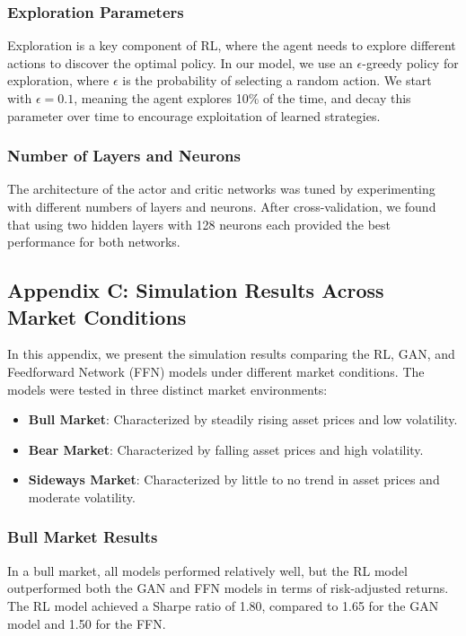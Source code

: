 \subsubsection*{Exploration Parameters}

Exploration is a key component of RL, where the agent needs to explore different actions to discover the optimal policy. In our model, we use an $\epsilon$-greedy policy for exploration, where $\epsilon$ is the probability of selecting a random action. We start with $\epsilon = 0.1$, meaning the agent explores 10\% of the time, and decay this parameter over time to encourage exploitation of learned strategies.

\subsubsection*{Number of Layers and Neurons}

The architecture of the actor and critic networks was tuned by experimenting with different numbers of layers and neurons. After cross-validation, we found that using two hidden layers with 128 neurons each provided the best performance for both networks.

\subsection*{Appendix C: Simulation Results Across Market Conditions}

In this appendix, we present the simulation results comparing the RL, GAN, and Feedforward Network (FFN) models under different market conditions. The models were tested in three distinct market environments:
\begin{itemize}
    \item \textbf{Bull Market}: Characterized by steadily rising asset prices and low volatility.
    \item \textbf{Bear Market}: Characterized by falling asset prices and high volatility.
    \item \textbf{Sideways Market}: Characterized by little to no trend in asset prices and moderate volatility.
\end{itemize}

\subsubsection*{Bull Market Results}

In a bull market, all models performed relatively well, but the RL model outperformed both the GAN and FFN models in terms of risk-adjusted returns. The RL model achieved a Sharpe ratio of 1.80, compared to 1.65 for the GAN model and 1.50 for the FFN.

